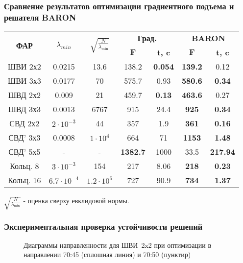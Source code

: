 \begin{frame}
    \frametitle{Сравнение результатов оптимизации градиентного подъема и решателя BARON}
    \begin{table}
\centering
\begin{tabular}{|c|c|c|c c|c c|}
    \hline
    \multirow{2}{*}{\textbf{ФАР}} & \multirow{2}{*}{$\lambda_{min}$} & \multirow{2}{*}{$\sqrt{\frac{N}{\lambda_{\min}}}$} & \multicolumn{2}{c}{\textbf{Град.}} & \multicolumn{2}{|c|}{\textbf{BARON}}\\
    & & & \textbf{$\textbf{F}$} & \textbf{t, c} & \textbf{$\textbf{F}$} & \textbf{t, c} \\
    \hline
    ШВИ 2х2 & 0.0215 & 13.6 & 138.2 & \textbf{0.054} & \textbf{139.2} & 0.12 \\
    ШВИ 3х3 & 0.0177 & 70 & 575.7 & 0.93 & \textbf{580.6} & \textbf{0.34} \\
    ШВД 2х2 & 0.009 & 21 & 459.7 & \textbf{0.13} & \textbf{463.6} & 0.27 \\
    ШВД 3х3 & 0.0013 & 6767 & 915 & 24.4 & \textbf{925} & \textbf{0.34}  \\
    СВД 2х2 & $2\cdot10^{-3}$ & 44& 357 & 1.9 & \textbf{361} & \textbf{0.16} \\
    СВД' 3х3 & 0.0008 & $1\cdot10^4$& 664 & 71 & \textbf{1153} & \textbf{1.48} \\
    СВД' 5х5 & - & - & \textbf{1382.7} & 1000 & 33.5 & \textbf{217.94}  \\
    Кольц. 8 & $3\cdot10^{-3}$ & 154 & 217 & 8.06 & \textbf{218} & \textbf{0.23} \\
    Кольц. 16 & $6.7\cdot10^{-4}$ & $1.2\cdot10^{6}$& 727 & 90.9 & \textbf{734} & \textbf{1.37} \\
    \hline
\end{tabular}
\label{tab:results}
\end{table}

$\sqrt{\frac{N}{\lambda_{\min}}}$ - оценка сверху евклидовой нормы.
\end{frame}


\begin{frame}
    \frametitle{Экспериментальная проверка устойчивости решений}
    \begin{figure}[h]
    \centering
    \vspace{0.7em}
    \caption{Диаграммы направленности для ШВИ~2x2 при оптимизации в направлении 70:45 (сплошная линия) и 70:50 (пунктир)}
    \label{ris:bve_comp}
    \end{figure}
\end{frame}

